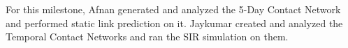 \documentclass[times, 10pt,twocolumn]{article}
\begin{document}
For this milestone, Afnan generated and analyzed the 5-Day Contact Network and performed static link prediction on it. Jaykumar created and analyzed the Temporal Contact Networks and ran the SIR simulation on them.








\end{document}
